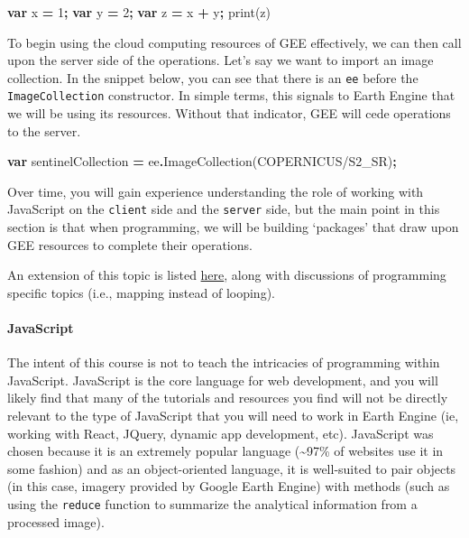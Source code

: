 \documentclass[
]{article}
\newenvironment{Shaded}{\begin{snugshade}}{\end{snugshade}}
\newcommand{\DecValTok}[1]{\textcolor[rgb]{0.00,0.00,0.81}{#1}}
\newcommand{\FunctionTok}[1]{\textcolor[rgb]{0.00,0.00,0.00}{#1}}
\newcommand{\KeywordTok}[1]{\textcolor[rgb]{0.13,0.29,0.53}{\textbf{#1}}}
\newcommand{\NormalTok}[1]{#1}
\newcommand{\OperatorTok}[1]{\textcolor[rgb]{0.81,0.36,0.00}{\textbf{#1}}}
\newcommand{\StringTok}[1]{\textcolor[rgb]{0.31,0.60,0.02}{#1}}
\begin{document}
\begin{Shaded}
\begin{Highlighting}[]
\KeywordTok{var}\NormalTok{ x }\OperatorTok{=} \DecValTok{1}\OperatorTok{;} \KeywordTok{var}\NormalTok{ y }\OperatorTok{=} \DecValTok{2}\OperatorTok{;}
\KeywordTok{var}\NormalTok{ z }\OperatorTok{=}\NormalTok{ x }\OperatorTok{+}\NormalTok{ y}\OperatorTok{;}
\FunctionTok{print}\NormalTok{(z)}
\end{Highlighting}
\end{Shaded}

To begin using the cloud computing resources of GEE effectively, we can then call upon the server side of the operations. Let's say we want to import an image collection. In the snippet below, you can see that there is an \texttt{ee} before the \texttt{ImageCollection} constructor. In simple terms, this signals to Earth Engine that we will be using its resources. Without that indicator, GEE will cede operations to the server.

\begin{Shaded}
\begin{Highlighting}[]
\KeywordTok{var}\NormalTok{ sentinelCollection }\OperatorTok{=}\NormalTok{ ee}\OperatorTok{.}\FunctionTok{ImageCollection}\NormalTok{(}\StringTok{\textquotesingle{}COPERNICUS/S2\_SR\textquotesingle{}}\NormalTok{)}\OperatorTok{;}
\end{Highlighting}
\end{Shaded}

Over time, you will gain experience understanding the role of working with JavaScript on the \texttt{client} side and the \texttt{server} side, but the main point in this section is that when programming, we will be building `packages' that draw upon GEE resources to complete their operations.

An extension of this topic is listed \href{https://developers.google.com/earth-engine/guides/client_server}{here}, along with discussions of programming specific topics (i.e., mapping instead of looping).

\hypertarget{javascript}{%
\paragraph*{JavaScript}\label{javascript}}

The intent of this course is not to teach the intricacies of programming within JavaScript. JavaScript is the core language for web development, and you will likely find that many of the tutorials and resources you find will not be directly relevant to the type of JavaScript that you will need to work in Earth Engine (ie, working with React, JQuery, dynamic app development, etc). JavaScript was chosen because it is an extremely popular language (\textasciitilde97\% of websites use it in some fashion) and as an object-oriented language, it is well-suited to pair objects (in this case, imagery provided by Google Earth Engine) with methods (such as using the \texttt{reduce} function to summarize the analytical information from a processed image).
\end{document}

